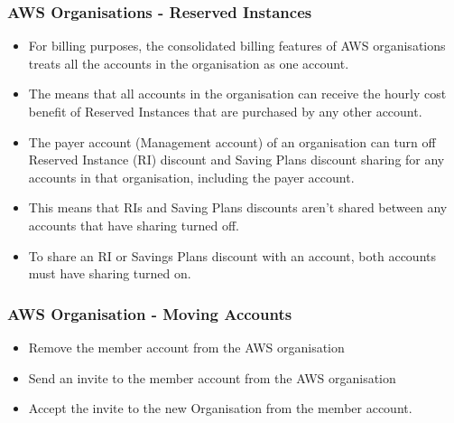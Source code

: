 \subsubsection{AWS Organisations - Reserved Instances}
\begin{itemize}
    \item For billing purposes, the consolidated billing features of AWS organisations treats all the accounts in the organisation as one account.
    \item The means that all accounts in the organisation can receive the hourly cost benefit of Reserved Instances that are purchased by any other account.
    \item The payer account (Management account) of an organisation can turn off Reserved Instance (RI) discount and Saving Plans discount sharing for any accounts in that organisation, including the payer account.
    \item This means that RIs and Saving Plans discounts aren't shared between any accounts that have sharing turned off.
    \item To share an RI or Savings Plans discount with an account, both accounts must have sharing turned on.
\end{itemize}

\subsubsection{AWS Organisation - Moving Accounts}
\begin{itemize}
    \item Remove the member account from the AWS organisation
    \item Send an invite to the member account from the AWS organisation
    \item Accept the invite to the new Organisation from the member account.
\end{itemize}

